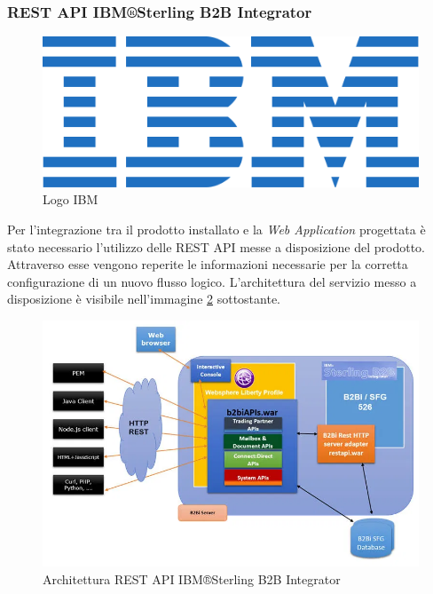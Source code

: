 \clearpage


\subsubsection{REST API IBM®Sterling B2B Integrator}
\begin{figure}
\begin{center}
\includegraphics[width=0.3\columnwidth]{images/IBM_logo.png}
\end{center}
\caption{Logo IBM}
\label{fig:ibmlogo}
\end{figure}


Per l'integrazione tra il prodotto installato e la \textit{Web Application} progettata è stato necessario l'utilizzo delle \gls{REST} \gls{API} messe a disposizione del prodotto. Attraverso esse vengono reperite le informazioni necessarie per la corretta configurazione di un nuovo flusso logico. L'architettura del servizio messo a disposizione è visibile nell'immagine \ref{fig:apirestste} sottostante.

\begin{figure}
\begin{center}
\includegraphics[width=1.0\columnwidth]{images/restapisterling.png}
\end{center}
\caption{Architettura REST API IBM®Sterling B2B Integrator}
\label{fig:apirestste}
\end{figure}






